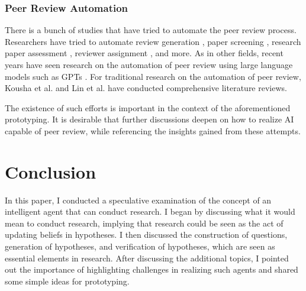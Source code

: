 
\subsubsection{Peer Review Automation}

There is a bunch of studies that have tried to automate the peer review process. Researchers have tried to automate review generation \cite{yuan2022can,yuan2022kid,wang2020reviewrobot}, paper screening \cite{schulz2022future}, research paper assessment \cite{kousha2022artificial}, reviewer assignment \cite{zhao2022reviewer}, and more. As in other fields, recent years have seen research on the automation of peer review using large language models such as GPTs \cite{wexin2023can,liu2023reviewergpt,robertson2023gpt4,hosseini2023fighting}. For traditional research on the automation of peer review,  Kousha et al. \cite{kousha2022artificial} and \cite{lin2021automated1} Lin et al. have conducted comprehensive literature reviews. 

The existence of such efforts is important in the context of the aforementioned prototyping. It is desirable that further discussions deepen on how to realize AI capable of peer review, while referencing the insights gained from these attempts.

\section{Conclusion}
In this paper, I conducted a speculative examination of the concept of an intelligent agent that can conduct research. I began by discussing what it would mean to conduct research, implying that research could be seen as the act of updating beliefs in hypotheses. I then discussed the construction of questions, generation of hypotheses, and verification of hypotheses, which are seen as essential elements in research. After discussing the additional topics, I pointed out the importance of highlighting challenges in realizing such agents and shared some simple ideas for prototyping.

